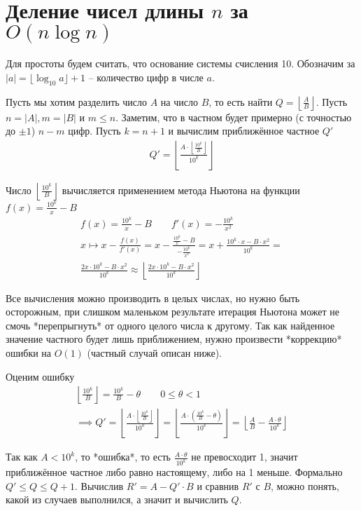 
\section{Деление чисел длины $n$ за $O(n \log n)$}

Для простоты будем считать, что основание системы счисления 10.
Обозначим за $|a| = \lfloor \log_{10} a \rfloor + 1$ -- количество цифр в числе $a$.

Пусть мы хотим разделить число $A$ на число $B$, то есть найти $Q = \left\lfloor \frac{A}{B} \right\rfloor$. Пусть $n = |A|, m = |B|$ и $m \le n$.
Заметим, что в частном будет примерно (с точностью до $\pm 1$) $n - m$ цифр.
Пусть $k = n + 1$ и вычислим приближённое частное $Q'$
\begin{gather}
    Q' = \left\lfloor \frac{A \cdot \left\lfloor \frac{10^k}{B} \right\rfloor}{10^k} \right\rfloor
\end{gather}

Число $\left\lfloor \frac{10^k}{B} \right\rfloor$ вычисляется применением метода Ньютона на функции $f(x) = \frac{10^k}{x} - B$
\begin{gather}
    f(x) = \frac{10^k}{x} - B \qquad f'(x) = -\frac{10^k}{x^2} \\
    x \mapsto x - \frac{f(x)}{f'(x)} =
    x - \frac{\frac{10^k}{x} - B}{-\frac{10^k}{x^2}} =
    x + \frac{10^k \cdot x - B \cdot x^2}{10^k} =
    \\
    \frac{2x \cdot 10^k - B \cdot x^2}{10^k} \approx \left\lfloor  \frac{2x \cdot 10^k - B \cdot x^2}{10^k} \right\rfloor
\end{gather}

Все вычисления можно производить в целых числах, но нужно быть осторожным, при слишком маленьком результате итерация Ньютона может не смочь *перепрыгнуть* от одного целого числа к другому.
Так как найденное значение частного будет лишь приближением, нужно произвести *коррекцию* ошибки на $O(1)$ (частный случай описан ниже).

Оценим ошибку
\begin{gather}
    \left\lfloor \frac{10^k}{B} \right\rfloor = \frac{10^k}{B} - \theta \qquad 0 \le \theta < 1
    \\
    \implies
    Q' = \left\lfloor \frac{A \cdot \left\lfloor \frac{10^k}{B} \right\rfloor}{10^k} \right\rfloor =
    \left\lfloor \frac{A \cdot \left( \frac{10^k}{B} - \theta \right)}{10^k} \right\rfloor =
    \left\lfloor \frac{A}{B} - \frac{A \cdot \theta}{10^k} \right\rfloor
\end{gather}

Так как $A < 10^k$, то *ошибка*, то есть $ \frac{A \cdot \theta}{10^k} $ не превосходит 1,
значит приближённое частное либо равно настоящему, либо на 1 меньше. Формально $Q' \le Q \le Q + 1$.
Вычислив $R' = A - Q' \cdot B$ и сравнив $R'$ с $B$, можно понять, какой из случаев выполнился, а значит и вычислить $Q$.